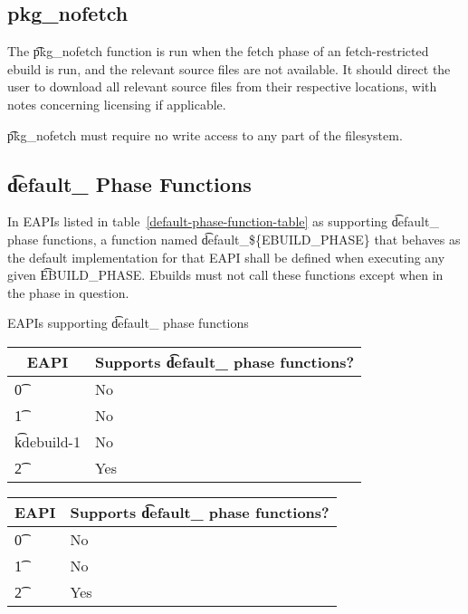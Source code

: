 \subsection{pkg\_nofetch}
\label{pkg-nofetch-function}

The \t{pkg\_nofetch} function is run when the fetch phase of an fetch-restricted ebuild is run, and
the relevant source files are not available. It should direct the user to download all relevant
source files from their respective locations, with notes concerning licensing if applicable.

\t{pkg\_nofetch} must require no write access to any part of the filesystem.

\subsection{\t{default\_} Phase Functions}

In EAPIs listed in table~\ref{default-phase-function-table} as supporting \t{default\_} phase
functions, a function named \t{default\_\$\{EBUILD\_PHASE\}} that behaves as the default
implementation for that EAPI shall be defined when executing any given \t{EBUILD\_PHASE}. Ebuilds
must not call these functions except when in the phase in question.

\begin{centertable}{EAPIs supporting \t{default\_} phase functions} \label{default-phase-function-table}
\IFKDEBUILDELSE
{
    \begin{tabular}{ l l }
        \toprule
            \multicolumn{1}{c}{\textbf{EAPI}} &
            \multicolumn{1}{c}{\textbf{Supports \t{default\_} phase functions?}} \\
            \midrule
    \t{0} & No \\
    \t{1} & No \\
    \t{kdebuild-1} & No \\
    \t{2} & Yes \\
    \bottomrule
    \end{tabular}
}{
    \begin{tabular}{ l l }
        \toprule
            \multicolumn{1}{c}{\textbf{EAPI}} &
            \multicolumn{1}{c}{\textbf{Supports \t{default\_} phase functions?}} \\
            \midrule
    \t{0} & No \\
    \t{1} & No \\
    \t{2} & Yes \\
    \bottomrule
    \end{tabular}
}
\end{centertable}


